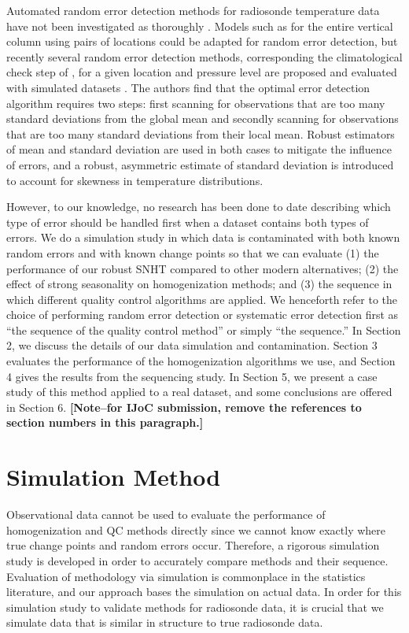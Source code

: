 \documentclass[12pt]{article}
\providecommand{\DIFaddtex}[1]{{\protect\color{blue}\uwave{#1}}} %
\providecommand{\DIFaddbegin}{} %
\providecommand{\DIFaddend}{} %
\providecommand{\DIFadd}[1]{\texorpdfstring{\DIFaddtex{#1}}{#1}} %
\begin{document}
\begin{doublespacing}
Automated random error detection methods for radiosonde temperature data have not been investigated as thoroughly \cite{durre06,durre08,lanzante96}.  Models such as \cite{ignaccolo14} for  the entire vertical column using pairs of locations could be adapted for random error detection, but  recently  several random error detection methods, corresponding \DIFaddbegin \DIFadd{to }\DIFaddend the climatological check step of \cite{durre08}, for a given location and pressure level are proposed and evaluated with simulated datasets \cite{bell14}. The authors find that the optimal error detection algorithm requires two steps: first scanning for observations that are too many standard deviations from the global mean and secondly scanning for observations that are too many standard deviations from their local mean.  Robust estimators of mean and standard deviation are used in both cases to mitigate the influence of errors, and a robust, asymmetric estimate of standard deviation is introduced to account for skewness in temperature distributions.

However, to our knowledge, no research has been done to date describing which type of error should be handled first when a dataset contains both types of errors.  We do a simulation study in which data is contaminated with both known random errors and with known change points so that we can  evaluate  (1) the performance of our robust SNHT compared to other modern alternatives; (2) the effect of strong seasonality on homogenization methods; and (3) the sequence in which different quality control algorithms are applied.  We henceforth refer to the choice of performing random error detection or systematic error detection first  as ``the sequence of the quality control method'' or simply ``the sequence.''  In Section 2, we discuss the details of our data simulation and contamination.  Section 3 evaluates the performance of the homogenization algorithms we use, and Section 4 gives the results from the sequencing study.  In Section 5, we present a case study of this method applied to a real dataset, and some conclusions are offered in Section 6.  \textbf{[Note--for IJoC submission, remove the references to section numbers in this paragraph.]}

\section{Simulation Method}
Observational data cannot be used to evaluate the performance of  homogenization and QC methods directly since we cannot know exactly where true change points and random errors occur.  Therefore, a rigorous simulation study is developed in order to accurately compare methods and their sequence.  Evaluation of methodology via simulation is commonplace in the statistics literature, and our approach bases the simulation on actual data.  In order for this simulation study to validate methods for radiosonde data, it is crucial that we simulate data that is similar in structure to true radiosonde data.


\end{doublespacing}
\end{document}
